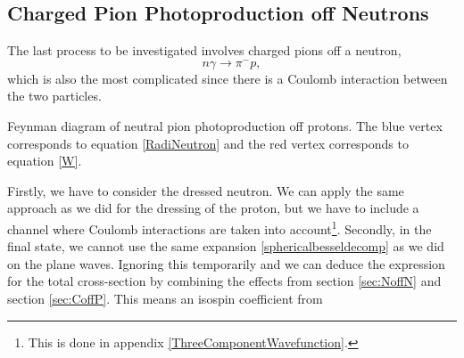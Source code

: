 \subsection{Charged Pion Photoproduction off Neutrons}\label{sec:chargedofne}
The last process to be investigated involves charged pions off a neutron,
\begin{equation} \label{proc4}
	n\gamma \rightarrow \pi^- p,
\end{equation}
which is also the most complicated since there is a Coulomb interaction between the two particles. 
\begin{marginfigure}
	\centering
	
	\caption{Feynman diagram of neutral pion photoproduction off protons. The blue vertex corresponds to equation \eqref{RadiNeutron} and the red vertex corresponds to equation \eqref{W}.}
	\label{Feynman4}
\end{marginfigure} 
Firstly, we have to consider the dressed neutron. We can apply the same approach as we did for the dressing of the proton, but we have to include a channel where Coulomb interactions are taken into account\footnote{This is done in appendix \ref{ThreeComponentWavefunction}.}. Secondly, in the final state, we cannot use the same expansion \eqref{sphericalbesseldecomp} as we did on the plane waves. 
Ignoring this temporarily and we can deduce the expression for the total cross-section by combining the effects from section \ref{sec:NoffN} and section \ref{sec:CoffP}. This means an isospin coefficient from

